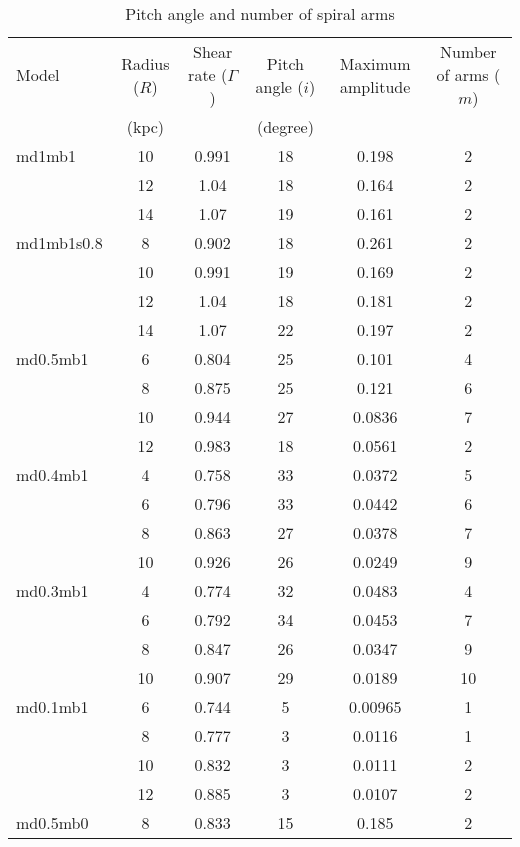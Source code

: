 \begin{table*}
\begin{center}
\caption{Pitch angle and number of spiral arms\label{tb:pitch_angle}}
\begin{tabular}{lccccc}
\hline
Model    & Radius ($R$) & Shear rate ($\Gamma$)& Pitch angle ($i$) & Maximum amplitude & Number of arms ($m$)\\
      &      (kpc) &            &  (degree) &                     &  \\ 
\hline  \hline
md1mb1     & 10 & 0.991 & 18 & 0.198 & 2 \\
           & 12 & 1.04 & 18 & 0.164 & 2 \\
           & 14 & 1.07 & 19 & 0.161 & 2 \\
md1mb1s0.8 & 8  & 0.902 & 18 & 0.261 & 2 \\
           & 10 & 0.991 & 19 & 0.169 & 2 \\
           & 12 & 1.04 & 18 & 0.181 & 2 \\
           & 14 & 1.07 & 22 & 0.197 & 2 \\
md0.5mb1   & 6 & 0.804 & 25 & 0.101 & 4 \\
           & 8 & 0.875 & 25 & 0.121 & 6 \\
           & 10 & 0.944 & 27 & 0.0836  & 7 \\
           & 12 & 0.983 & 18 & 0.0561 & 2 \\
md0.4mb1   & 4 & 0.758 & 33 & 0.0372 & 5 \\
           & 6 & 0.796 & 33 & 0.0442 & 6 \\
           & 8 & 0.863 & 27 & 0.0378 & 7 \\
           & 10 & 0.926 & 26 & 0.0249 & 9 \\
md0.3mb1   & 4 & 0.774 & 32 & 0.0483 & 4 \\
           & 6 & 0.792 & 34 & 0.0453 & 7 \\
           & 8 & 0.847 & 26 & 0.0347 & 9 \\
           & 10 & 0.907 & 29 & 0.0189 & 10 \\
md0.1mb1   & 6 & 0.744 & 5 & 0.00965 & 1 \\
           & 8 & 0.777 & 3 & 0.0116 & 1 \\
           & 10 & 0.832 & 3 & 0.0111 & 2 \\
           & 12 & 0.885 & 3 & 0.0107 & 2 \\
md0.5mb0   & 8 & 0.833 & 15 & 0.185 & 2 \\

\end{tabular}
\end{center}
\end{table*}
